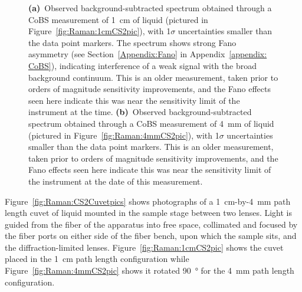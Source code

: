 \begin{figure}[h!]
\begin{subfigure}[b]{0.49\textwidth}
    \caption{}
    \label{fig:Raman:4mmCS2}
  \end{subfigure}
  \caption[\ac{CoBS} measurements of \SI{1}{\centi\meter} and \SI{4}{\milli\meter} liquid .]{\textbf{(a)}~Observed background-subtracted spectrum obtained through a \ac{CoBS} measurement of \SI{1}{\centi\meter} of liquid  (pictured in Figure~\ref{fig:Raman:1cmCS2pic}), with 1\(\sigma\) uncertainties smaller than the data point markers. The spectrum shows strong Fano asymmetry (see Section~\ref{Appendix:Fano} in Appendix~\ref{appendix: CoBS}), indicating interference of a weak signal with the broad background continuum. This is an older measurement, taken prior to orders of magnitude sensitivity improvements, and the Fano effects seen here indicate this was near the sensitivity limit of the instrument at the time. \textbf{(b)}~Observed background-subtracted spectrum obtained through a \ac{CoBS} measurement of \SI{4}{\milli\meter} of liquid  (pictured in Figure~\ref{fig:Raman:4mmCS2pic}), with 1\(\sigma\) uncertainties smaller than the data point markers. This is an older measurement, taken prior to orders of magnitude sensitivity improvements, and the Fano effects seen here indicate this was near the sensitivity limit of the instrument at the date of this measurement.}
  \label{fig:Raman:CS2Cuvet}
\end{figure}

Figure~\ref{fig:Raman:CS2Cuvetpics} shows photographs of a \SI{1}{\centi\meter}-by-\SI{4}{\milli\meter} path length cuvet of liquid  mounted in the sample stage between two lenses. Light is guided from the fiber of the apparatus into free space, collimated and focused by the fiber ports on either side of the fiber bench, upon which the sample sits, and the diffraction-limited lenses. Figure~\ref{fig:Raman:1cmCS2pic} shows the cuvet placed in the \SI{1}{\centi\meter} path length configuration while Figure~\ref{fig:Raman:4mmCS2pic} shows it rotated \SI{90}{\degree} for the \SI{4}{\milli\meter} path length configuration.


